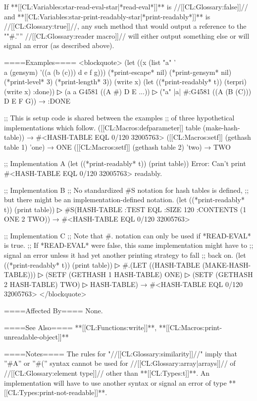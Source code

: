 If **[[CL:Variables:star-read-eval-star|*read-eval*]]** is //[[CL:Glossary:false]]// and **[[CL:Variables:star-print-readably-star|*print-readably*]]** is //[[CL:Glossary:true]]//, any such method that would output a reference to the ""#.'''' //[[CL:Glossary:reader macro]]// will either output something else or will signal an error (as described above).

====Examples====
<blockquote> (let ((x (list "a" '\\a (gensym) '((a (b (c))) d e f g))) (*print-escape* nil) (*print-gensym* nil) (*print-level* 3) (*print-length* 3)) (write x) (let ((*print-readably* t)) (terpri) (write x) :done))
▷ (a a G4581 ((A #) D E ...))
▷ ("a" |a| #:G4581 ((A (B (C))) D E F G)) → :DONE

;; This is setup code is shared between the examples ;; of three hypothetical implementations which follow. ([[CL:Macros:defparameter]] table (make-hash-table)) → #<HASH-TABLE EQL 0/120 32005763> ([[CL:Macros:setf]] (gethash table 1) 'one) → ONE ([[CL:Macros:setf]] (gethash table 2) 'two) → TWO

;; Implementation A (let ((*print-readably* t)) (print table)) Error: Can't print #<HASH-TABLE EQL 0/120 32005763> readably.

;; Implementation B ;; No standardized #S notation for hash tables is defined, ;; but there might be an implementation-defined notation. (let ((*print-readably* t)) (print table))
▷ #S(HASH-TABLE :TEST EQL :SIZE 120 :CONTENTS (1 ONE 2 TWO)) → #<HASH-TABLE EQL 0/120 32005763>

;; Implementation C ;; Note that #. notation can only be used if *READ-EVAL* is true. ;; If *READ-EVAL* were false, this same implementation might have to ;; signal an error unless it had yet another printing strategy to fall ;; back on. (let ((*print-readably* t)) (print table))
▷ #.(LET ((HASH-TABLE (MAKE-HASH-TABLE)))
▷ (SETF (GETHASH 1 HASH-TABLE) ONE)
▷ (SETF (GETHASH 2 HASH-TABLE) TWO)
▷ HASH-TABLE) → #<HASH-TABLE EQL 0/120 32005763> </blockquote>

====Affected By====
None.

====See Also====
**[[CL:Functions:write]]**, **[[CL:Macros:print-unreadable-object]]**

====Notes====
The rules for "//[[CL:Glossary:similarity]]//" imply that ''#A'' or ''#('' syntax cannot be used for //[[CL:Glossary:array|arrays]]// of //[[CL:Glossary:element type]]// other than **[[CL:Types:t]]**. An implementation will have to use another syntax or signal an error of type **[[CL:Types:print-not-readable]]**.

  
